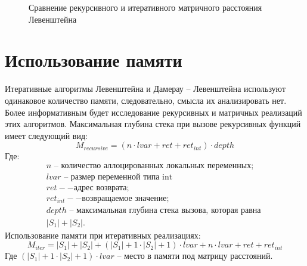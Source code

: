 \begin{figure}[h!]
	\begin{center}
	\end{center}
	\caption{Сравнение рекурсивного и итеративного матричного расстояния Левенштейна}
\end{figure}

\section{Использование памяти}

Итеративные алгоритмы Левенштейна и Дамерау -- Левенштейна используют одинаковое количество памяти, следовательно, смысла их анализировать нет. Более информативным будет исследование рекурсивных и матричных реализаций этих алгоритмов. Максимальная глубина стека при вызове рекурсивных функций имеет следующий вид:
\begin{equation}\label{rec-mem}
	M_{recursive} = (n \cdot lvar + ret + ret_{int}) \cdot depth
\end{equation}
Где:
\[
\begin{array}{l}
	n\text{ -- количество аллоцированных локальных переменных}; \\
	lvar\text{ -- размер переменной типа int} \\
	ret -- \text{адрес возврата;}\\
	ret_{int} -- \text{возвращаемое значение;}\\
	depth\text{ --  максимальная глубина стека вызова, которая равна } \\
	|S_1| + |S_2|.
\end{array}
\]
Использование памяти при итеративных реализациях: 
\begin{equation}
	M_{iter} = |S_1| + |S_2| + (|S_1| + 1 \cdot |S_2| + 1) \cdot lvar + n \cdot lvar + ret + ret_{int}
\end{equation}
Где $(|S_1| + 1 \cdot |S_2| + 1) \cdot lvar$ -- место в памяти под матрицу расстояний.

